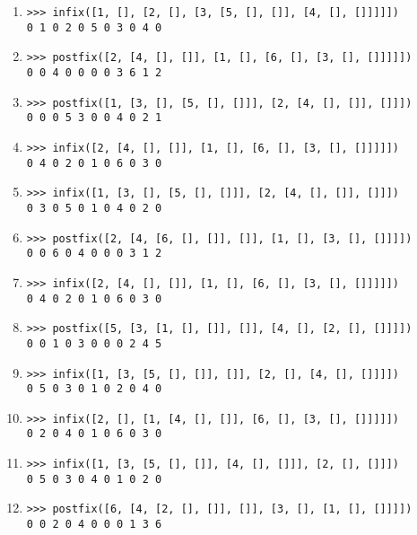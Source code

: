 \documentclass[11pt,a4paper]{article}
\begin{document}
\begin{enumerate}
\item \texttt{>{>}> infix([1, [], [2, [], [3, [5, [], []], [4, [], []]]]])}\\
\texttt{0 1 0 2 0 5 0 3 0 4 0 }

\item \texttt{>{>}> postfix([2, [4, [], []], [1, [], [6, [], [3, [], []]]]])}\\
\texttt{0 0 4 0 0 0 0 3 6 1 2 }

\item \texttt{>{>}> postfix([1, [3, [], [5, [], []]], [2, [4, [], []], []]])}\\
\texttt{0 0 0 5 3 0 0 4 0 2 1 }

\item \texttt{>{>}> infix([2, [4, [], []], [1, [], [6, [], [3, [], []]]]])}\\
\texttt{0 4 0 2 0 1 0 6 0 3 0 }

\item \texttt{>{>}> infix([1, [3, [], [5, [], []]], [2, [4, [], []], []]])}\\
\texttt{0 3 0 5 0 1 0 4 0 2 0 }

\item \texttt{>{>}> postfix([2, [4, [6, [], []], []], [1, [], [3, [], []]]])}\\
\texttt{0 0 6 0 4 0 0 0 3 1 2 }

\item \texttt{>{>}> infix([2, [4, [], []], [1, [], [6, [], [3, [], []]]]])}\\
\texttt{0 4 0 2 0 1 0 6 0 3 0 }

\item \texttt{>{>}> postfix([5, [3, [1, [], []], []], [4, [], [2, [], []]]])}\\
\texttt{0 0 1 0 3 0 0 0 2 4 5 }

\item \texttt{>{>}> infix([1, [3, [5, [], []], []], [2, [], [4, [], []]]])}\\
\texttt{0 5 0 3 0 1 0 2 0 4 0 }

\item \texttt{>{>}> infix([2, [], [1, [4, [], []], [6, [], [3, [], []]]]])}\\
\texttt{0 2 0 4 0 1 0 6 0 3 0 }

\item \texttt{>{>}> infix([1, [3, [5, [], []], [4, [], []]], [2, [], []]])}\\
\texttt{0 5 0 3 0 4 0 1 0 2 0 }

\item \texttt{>{>}> postfix([6, [4, [2, [], []], []], [3, [], [1, [], []]]])}\\
\texttt{0 0 2 0 4 0 0 0 1 3 6 }


\end{enumerate}
\end{document}
